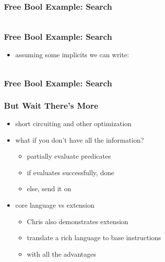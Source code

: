 \documentclass{beamer}
\begin{document}
\begin{frame}
  \frametitle{Free Bool Example: Search}
  \inputminted{scala}{snippets/search-predicate.scala}
\end{frame}

\begin{frame}
  \frametitle{Free Bool Example: Search}
  \begin{itemize}
  \item assuming some implicits we can write:
  \end{itemize}
  \inputminted{scala}{snippets/example-search-predicate.scala}
\end{frame}

\begin{frame}
  \frametitle{Free Bool Example: Search}
\end{frame}

\begin{frame}
  \frametitle{But Wait There's More}
  \begin{itemize}
  \item short circuiting and other optimization
  \item what if you don't have all the information?
    \begin{itemize}
    \item partially evaluate predicates
    \item if evaluates successfully, done
    \item else, send it on
    \end{itemize}
  \item core language vs extension
    \begin{itemize}
    \item Chris also demonstrates extension
    \item translate a rich language to base instructions
    \item with all the advantages
    \end{itemize}
  \end{itemize}
\end{frame}
\end{document}
